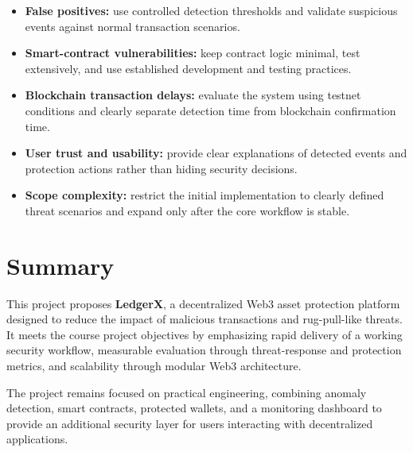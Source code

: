 \documentclass[10pt,a4paper]{article}
\begin{document}
\begin{itemize}
    \item \textbf{False positives:} use controlled detection thresholds and validate suspicious events against normal transaction scenarios.

    \item \textbf{Smart-contract vulnerabilities:} keep contract logic minimal, test extensively, and use established development and testing practices.

    \item \textbf{Blockchain transaction delays:} evaluate the system using testnet conditions and clearly separate detection time from blockchain confirmation time.

    \item \textbf{User trust and usability:} provide clear explanations of detected events and protection actions rather than hiding security decisions.

    \item \textbf{Scope complexity:} restrict the initial implementation to clearly defined threat scenarios and expand only after the core workflow is stable.
\end{itemize}

\section{Summary}

This project proposes \textbf{LedgerX}, a decentralized Web3 asset protection platform designed to reduce the impact of malicious transactions and rug-pull-like threats. It meets the course project objectives by emphasizing rapid delivery of a working security workflow, measurable evaluation through threat-response and protection metrics, and scalability through modular Web3 architecture.

The project remains focused on practical engineering, combining anomaly detection, smart contracts, protected wallets, and a monitoring dashboard to provide an additional security layer for users interacting with decentralized applications.
\end{document}
